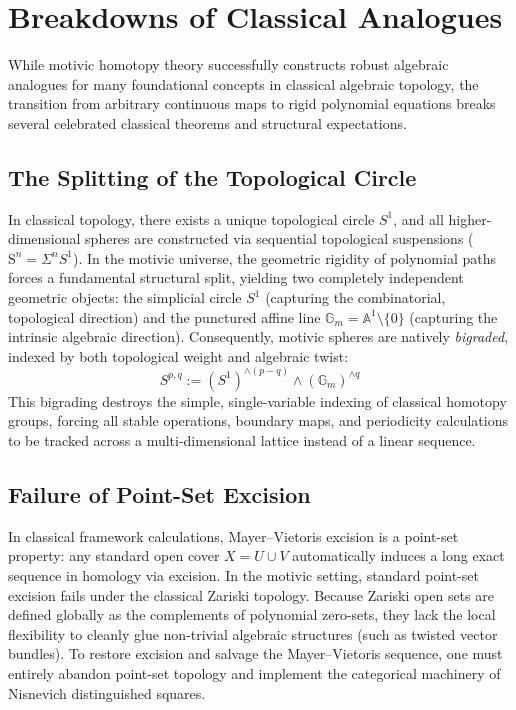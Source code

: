 \documentclass[11pt,oneside]{article}
\begin{document}
\section{Breakdowns of Classical Analogues}
\label{sec:breakdowns}

While motivic homotopy theory successfully constructs robust algebraic analogues for many foundational concepts in classical algebraic topology, the transition from arbitrary continuous maps to rigid polynomial equations breaks several celebrated classical theorems and structural expectations. 

\subsection{The Splitting of the Topological Circle}
In classical topology, there exists a unique topological circle $S^1$, and all higher-dimensional spheres are constructed via sequential topological suspensions ($\text{S}^n = \Sigma^n S^1$). In the motivic universe, the geometric rigidity of polynomial paths forces a fundamental structural split, yielding two completely independent geometric objects: the simplicial circle $S^1$ (capturing the combinatorial, topological direction) and the punctured affine line $\mathbb{G}_m = \mathbb{A}^1 \setminus \{0\}$ (capturing the intrinsic algebraic direction). Consequently, motivic spheres are natively \emph{bigraded}, indexed by both topological weight and algebraic twist:
\begin{equation}
S^{p,q} := (S^1)^{\wedge (p-q)} \wedge (\mathbb{G}_m)^{\wedge q}
\end{equation}
This bigrading destroys the simple, single-variable indexing of classical homotopy groups, forcing all stable operations, boundary maps, and periodicity calculations to be tracked across a multi-dimensional lattice instead of a linear sequence.

\subsection{Failure of Point-Set Excision}
In classical framework calculations, Mayer--Vietoris excision is a point-set property: any standard open cover $X = U \cup V$ automatically induces a long exact sequence in homology via excision. In the motivic setting, standard point-set excision fails under the classical Zariski topology. Because Zariski open sets are defined globally as the complements of polynomial zero-sets, they lack the local flexibility to cleanly glue non-trivial algebraic structures (such as twisted vector bundles). To restore excision and salvage the Mayer--Vietoris sequence, one must entirely abandon point-set topology and implement the categorical machinery of Nisnevich distinguished squares.
\end{document}
